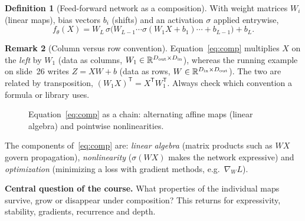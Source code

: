 \documentclass[11pt,a4paper]{article}
\newcommand{\R}{\mathbb{R}}
\newcommand{\T}{^{\mathsf{T}}}
\theoremstyle{definition}
\newtheorem{definition}{Definition}[section]
\newtheorem{remark}[definition]{Remark}
\theoremstyle{plain}
\begin{document}
\begin{definition}[Feed-forward network as a composition]\label{def:comp}
With weight matrices $W_i$ (linear maps), bias vectors $b_i$ (shifts) and an activation $\sigma$ applied entrywise,
\begin{equation}\label{eq:comp}
f_\theta(X)=W_L\,\sigma\!\big(W_{L-1}\cdots\sigma(W_1X+b_1)\cdots+b_{L-1}\big)+b_L .
\end{equation}
\end{definition}

\begin{remark}[Column versus row convention]
Equation~\eqref{eq:comp} multiplies $X$ on the \emph{left} by $W_1$ (data as columns, $W_1\in\R^{D_{\rm out}\times D_{\rm in}}$), whereas the running example on slide~26 writes $Z=XW+b$ (data as rows, $W\in\R^{D_{\rm in}\times D_{\rm out}}$). The two are related by transposition, $(W_1X)\T = X\T W_1\T$. Always check which convention a formula or library uses.
\end{remark}

\begin{figure}[ht]
\centering
{}
\caption{Equation~\eqref{eq:comp} as a chain: alternating affine maps (linear algebra) and pointwise nonlinearities.}
\end{figure}

The components of~\eqref{eq:comp} are: \emph{linear algebra} (matrix products such as $WX$ govern propagation), \emph{nonlinearity} ($\sigma(WX)$ makes the network expressive) and \emph{optimization} (minimizing a loss with gradient methods, e.g.\ $\nabla_W L$).

\textbf{Central question of the course.} What properties of the individual maps survive, grow or disappear under composition? This returns for expressivity, stability, gradients, recurrence and depth.
\end{document}
